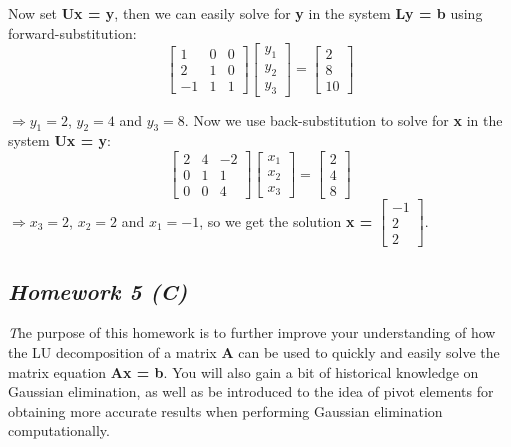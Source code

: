 \documentclass[11pt,a4paper,oneside]{report}
\begin{document}
\begin{framed}
Now set {\bf Ux = y}, then we can easily solve for {\bf y} in the system {\bf Ly = b} using forward-substitution:
\[
\begin{bmatrix}
1 & 0 & 0\\
2 & 1 & 0\\
-1 & 1 & 1
\end{bmatrix}
\begin{bmatrix}
y_1 \\
y_2 \\
y_3
\end{bmatrix}
=
\begin{bmatrix}
2\\
8\\
10
\end{bmatrix}
\]

$\Rightarrow y_1 = 2$, $y_2 = 4$ and $y_3 = 8$. Now we use back-substitution to solve for {\bf x} in the system {\bf Ux = y}:
\[
\begin{bmatrix}
2 & 4 & -2\\
0 & 1 & 1\\
0 & 0 & 4
\end{bmatrix}
\begin{bmatrix}
x_1 \\
x_2 \\
x_3
\end{bmatrix}
=
\begin{bmatrix}
2\\
4\\
8
\end{bmatrix}
\]
$\Rightarrow x_3 = 2$, $x_2 = 2$ and $x_1 = -1$, so we get the solution {\bf x = } $\begin{bmatrix}-1\\2\\2\end{bmatrix}$.
\end{framed}
\pagebreak

{\center\color{magenta}
\subsection*{\it\huge Homework 5 (C)}}
{\it\huge T}he purpose of this homework is to further improve your understanding of how the LU decomposition of a matrix {\bf A} can be used to quickly and easily solve the matrix equation {\bf Ax = b}. You will also gain a bit of historical knowledge on Gaussian elimination, as well as be introduced to the idea of pivot elements for obtaining more accurate results when performing Gaussian elimination computationally.\\
\end{document}
